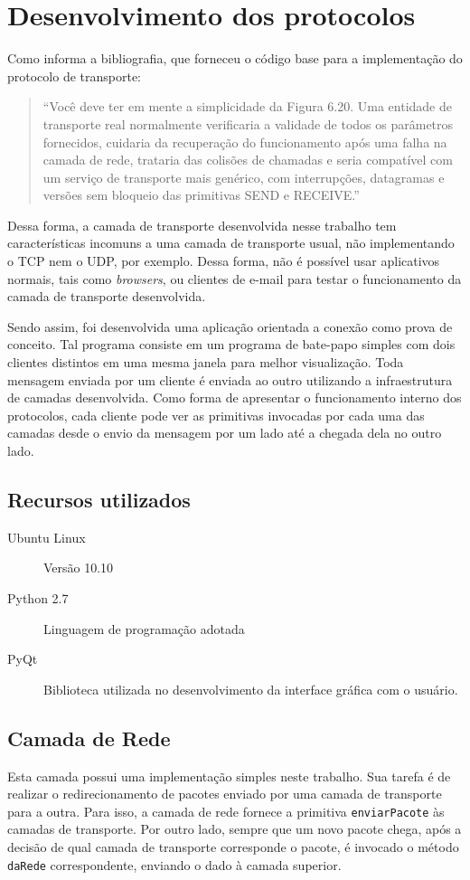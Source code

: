 \documentclass[brazil,times,12pt]{abnt}
\begin{document}
\section*{Desenvolvimento dos protocolos}
	Como informa a bibliografia, que forneceu o código base para a implementação do
	protocolo de transporte:
	
	\begin{quote}
	``Você deve ter em mente a simplicidade da Figura 6.20. Uma entidade de transporte real
	normalmente verificaria a validade de todos os parâmetros fornecidos, cuidaria
	da recuperação do funcionamento após uma falha na camada de rede, trataria das
	colisões de chamadas e seria compatível com um serviço de transporte mais
	genérico, com interrupções, datagramas e versões sem bloqueio das primitivas
	SEND e RECEIVE.'' \cite{tanenbaum:redes-computadores}
	\end{quote}
	
	Dessa forma, a camada de transporte desenvolvida nesse trabalho tem
	características incomuns a uma camada de transporte usual, não implementando o
	TCP nem o UDP, por exemplo. Dessa forma, não é possível usar aplicativos
	normais, tais como \emph{browsers}, ou clientes de e-mail para testar o
	funcionamento da camada de transporte desenvolvida.
	
	Sendo assim, foi desenvolvida uma aplicação orientada a conexão como prova de
	conceito. Tal programa consiste em um programa de bate-papo simples com dois
	clientes distintos em uma mesma janela para melhor visualização. Toda mensagem
	enviada por um cliente é enviada ao outro utilizando a infraestrutura de
	camadas desenvolvida. Como forma de apresentar o funcionamento interno dos
	protocolos, cada cliente pode ver as primitivas invocadas por cada uma das
	camadas desde o envio da mensagem por um lado até a chegada dela no outro lado.
	
\subsection*{Recursos utilizados}
	\begin{description}
	  \item[Ubuntu Linux] Versão 10.10
	  \item[Python 2.7] Linguagem de programação adotada
	  \item[PyQt] Biblioteca utilizada no desenvolvimento da interface gráfica com
	  o usuário.
	\end{description}

\subsection*{Camada de Rede}
	Esta camada possui uma implementação simples neste trabalho. Sua tarefa é de
	realizar o redirecionamento de pacotes enviado por uma camada de transporte
	para a outra. Para isso, a camada de rede fornece a primitiva
	\texttt{enviarPacote} às camadas de transporte. Por outro lado, sempre que um
	novo pacote chega, após a decisão de qual camada de transporte corresponde o
	pacote, é invocado o método \texttt{daRede} correspondente, enviando o dado à
	camada superior.
\end{document}
